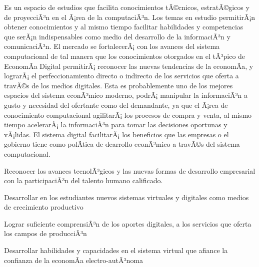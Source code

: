\begin{syllabus}


\begin{justification}
Es un espacio de estudios que facilita conocimientos tÃ©cnicos, estratÃ©gicos y de proyecciÃ³n en el Ã¡rea de la computaciÃ³n. Los temas en estudio permitirÃ¡n obtener conocimientos y al mismo tiempo facilitar habilidades y competencias que serÃ¡n indispensables como medio del desarrollo de la informaciÃ³n y comunicaciÃ³n. El mercado se fortalecerÃ¡ con los avances del sistema computacional de tal manera que los conocimientos otorgados en el tÃ³pico de EconomÃ­a Digital permitirÃ¡ reconocer las nuevas tendencias de la economÃ­a, y lograrÃ¡ el perfeccionamiento directo o indirecto de los servicios que oferta a travÃ©s de los medios digitales. Esta es probablemente uno de los mejores espacios del sistema econÃ³mico moderno, podrÃ¡ manipular la informaciÃ³n a gusto y necesidad del ofertante como del demandante, ya que el Ã¡rea de conocimiento computacional agilitarÃ¡ los procesos de compra y venta, al mismo tiempo acelerarÃ¡ la informaciÃ³n para tomar las decisiones oportunas y vÃ¡lidas. El sistema digital facilitarÃ¡ los beneficios que las empresas o el gobierno tiene como polÃ­tica de dearrollo econÃ³mico a travÃ©s del sistema computacional.
\end{justification}

\begin{goals}
\item Reconocer los avances tecnolÃ³gicos y las nuevas formas de desarrollo empresarial con la participaciÃ³n del talento humano calificado.
\item Desarrollar en los estudiantes nuevos sistemas virtuales y digitales como medios de crecimiento productivo
\item Lograr suficiente comprensiÃ³n de los aportes digitales, a los servicios que oferta los campos de producciÃ³n
\item Desarrollar habilidades y capacidades en el sistema virtual que afiance la confianza de la economÃ­a electro-autÃ³noma
\end{goals}

\begin{outcomes}
\end{outcomes}


\end{syllabus}
